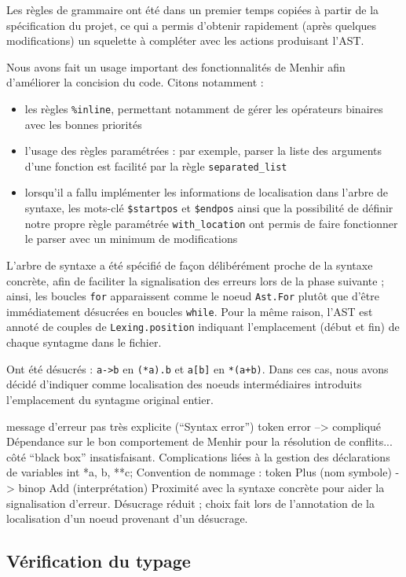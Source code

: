 \documentclass[a4paper, 11pt]{article}
\begin{document}
Les règles de grammaire ont été dans un premier temps copiées à partir de la
spécification du projet, ce qui a permis d'obtenir rapidement (après quelques modifications)
un squelette à compléter avec les actions produisant l'AST.

Nous avons fait un usage important des fonctionnalités de Menhir afin d'améliorer la
concision du code. Citons notamment :
\begin{itemize}
\item les règles \texttt{\%inline}, permettant notamment de gérer les opérateurs binaires
  avec les bonnes priorités
\item l'usage des règles paramétrées : par exemple, parser la liste des arguments
  d'une fonction est facilité par la règle \texttt{separated\_list}
\item lorsqu'il a fallu implémenter les informations de localisation dans l'arbre
  de syntaxe, les mots-clé \texttt{\$startpos} et \texttt{\$endpos} ainsi que la
  possibilité de définir notre propre règle paramétrée \texttt{with\_location}
  ont permis de faire fonctionner le parser avec un minimum de modifications
\end{itemize}

L'arbre de syntaxe a été spécifié de façon délibérément proche de la syntaxe concrète,
afin de faciliter la signalisation des erreurs lors de la phase suivante ; ainsi, les boucles
\texttt{for} apparaissent comme le noeud \texttt{Ast.For} plutôt que d'être immédiatement
désucrées en boucles \texttt{while}. Pour la même raison, l'AST est annoté de couples
de \texttt{Lexing.position} indiquant l'emplacement (début et fin) de chaque syntagme
dans le fichier.

Ont été désucrés : \texttt{a->b} en \texttt{(*a).b} et \texttt{a[b]} en \texttt{*(a+b)}.
Dans ces cas, nous avons décidé d'indiquer comme localisation des noeuds intermédiaires
introduits l'emplacement du syntagme original entier.

message d'erreur pas très explicite (``Syntax error'')
token error --> compliqué
Dépendance sur le bon comportement de Menhir pour la résolution de conflits...
côté ``black box'' insatisfaisant.
Complications liées à la gestion des déclarations de variables
int *a, b, **c;
Convention de nommage : token Plus (nom symbole) -> binop Add (interprétation)
Proximité avec la syntaxe concrète pour aider la signalisation d'erreur.
Désucrage réduit ; choix fait lors de l'annotation de la localisation
d'un noeud provenant d'un désucrage.

\subsection{Vérification du typage}
\end{document}

